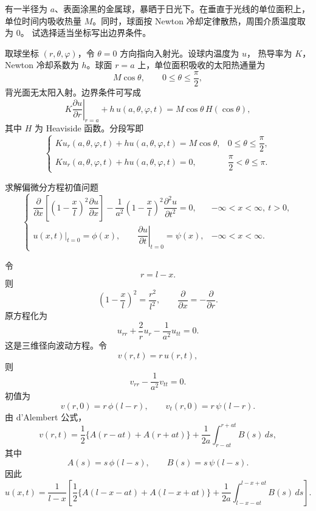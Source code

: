 \begin{question}
有一半径为 \(a\)、表面涂黑的金属球，暴晒于日光下。在垂直于光线的单位面积上，
单位时间内吸收热量 \(M\)。同时，球面按 Newton 冷却定律散热，周围介质温度取为 \(0\)。
试选择适当坐标写出边界条件。

\begin{solution}
取球坐标 \((r,\theta,\varphi)\)，令 \(\theta=0\) 方向指向入射光。设球内温度为 \(u\)，
热导率为 \(K\)，Newton 冷却系数为 \(h\)。球面 \(r=a\) 上，单位面积吸收的太阳热通量为
\[
M\cos\theta,\qquad 0\le\theta\le\frac{\pi}{2},
\]
背光面无太阳入射。边界条件可写成
\[
K\left.\frac{\partial u}{\partial r}\right|_{r=a}
+h\,u(a,\theta,\varphi,t)
=M\cos\theta\,H(\cos\theta),
\]
其中 \(H\) 为 Heaviside 函数。分段写即
\[
\begin{cases}
K u_r(a,\theta,\varphi,t)+h u(a,\theta,\varphi,t)=M\cos\theta,
&0\le\theta\le \dfrac{\pi}{2},\\
K u_r(a,\theta,\varphi,t)+h u(a,\theta,\varphi,t)=0,
&\dfrac{\pi}{2}<\theta\le \pi.
\end{cases}
\]
\end{solution}
\end{question}

\begin{question}
求解偏微分方程初值问题
\[
\begin{cases}
\dfrac{\partial}{\partial x}
\left[\left(1-\dfrac{x}{l}\right)^2\dfrac{\partial u}{\partial x}\right]
-\dfrac{1}{a^2}\left(1-\dfrac{x}{l}\right)^2
\dfrac{\partial^2u}{\partial t^2}=0,
&-\infty<x<\infty,\ t>0,\\
u(x,t)|_{t=0}=\phi(x),\qquad
\left.\dfrac{\partial u}{\partial t}\right|_{t=0}=\psi(x),
&-\infty<x<\infty.
\end{cases}
\]
\begin{solution}
令
\[
r=l-x.
\]
则
\[
\left(1-\frac{x}{l}\right)^2=\frac{r^2}{l^2},\qquad
\frac{\partial}{\partial x}=-\frac{\partial}{\partial r}.
\]
原方程化为
\[
u_{rr}+\frac{2}{r}u_r-\frac{1}{a^2}u_{tt}=0.
\]
这是三维径向波动方程。令
\[
v(r,t)=r\,u(r,t),
\]
则
\[
v_{rr}-\frac{1}{a^2}v_{tt}=0.
\]
初值为
\[
v(r,0)=r\,\phi(l-r),\qquad
v_t(r,0)=r\,\psi(l-r).
\]
由 d'Alembert 公式，
\[
v(r,t)=\frac12\{A(r-at)+A(r+at)\}
+\frac{1}{2a}\int_{r-at}^{r+at}B(s)\,ds,
\]
其中
\[
A(s)=s\,\phi(l-s),\qquad B(s)=s\,\psi(l-s).
\]
因此
\[
u(x,t)=\frac{1}{l-x}
\left[
\frac12\{A(l-x-at)+A(l-x+at)\}
+\frac{1}{2a}\int_{l-x-at}^{l-x+at}B(s)\,ds
\right].
\]
\end{solution}
\end{question}

